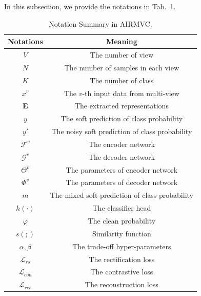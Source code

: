 \documentclass{article}
\theoremstyle{plain}
\theoremstyle{definition}
\theoremstyle{remark}
\begin{document}
In this subsection, we provide the notations in Tab.~\ref{notation_table}.

\begin{table}[h]
\centering
\caption{Notation Summary in AIRMVC.}
\begin{tabular}{c|c}
\hline
\textbf{Notations} & \textbf{Meaning}                               \\ \hline
$V$                  & The number of view                             \\
$N$                  & The number of samples in each view             \\
$K$                  & The number of class                            \\
$x^v$                  & The $v$-th input data from multi-view            \\
\textbf{E}                  & The extracted representations                  \\
$y$                  & The soft prediction of class probability       \\
$y'$                & The noisy soft prediction of class probability \\
$\mathcal{F}^v$                  & The encoder network                            \\
$\mathcal{G}^v$                   & The decoder network                            \\
$\Theta^v$                 & The parameters of encoder network              \\
$\Phi^v$                  & The parameters of decoder network              \\
$m$                  & The mixed soft prediction of class probability  \\
$h(\cdot)$                  & The classifier head                            \\
$\varphi$                  & The clean probability                          \\
$s(;)$                  & Similarity function                            \\
$\alpha, \beta$                  & The trade-off hyper-parameters                 \\
$\mathcal{L}_{rs}$                  & The rectification loss                         \\
$\mathcal{L}_{con}$                   & The contrastive loss                           \\
$\mathcal{L}_{rec}$                   & The reconstruction loss                        \\ \hline
\end{tabular}
\label{notation_table}
\end{table}
\end{document}
